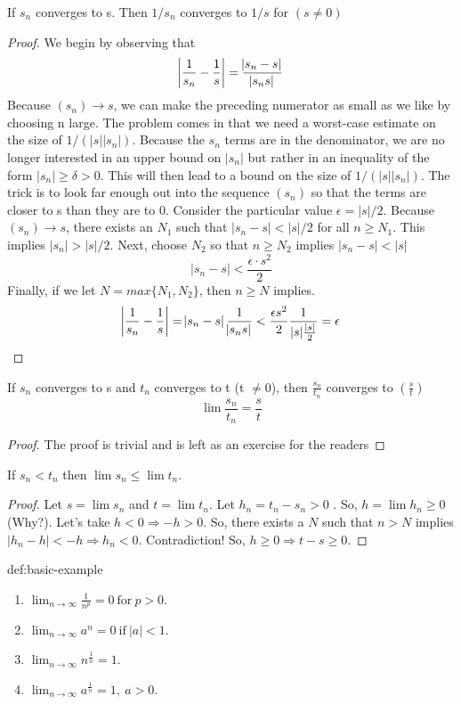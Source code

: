 \documentclass{notes}
\begin{document}
\begin{theorem}{}
	If $s_n$ converges to s. Then $1/s_n$ converges to $1/s$  for $(s \not = 0)$
\end{theorem}
\begin{proof}
	We begin by observing that
	$$  \abs{\frac{1}{s_n}- \frac{1}{s}} = \frac{\abs{s_n- s}}{\abs{ s_n s}}$$
	Because $(s_n) \rightarrow s$, we can make the preceding numerator as small as we like by
	choosing n large. The problem comes in that we need a worst-case estimate on
	the size of $1/(|s||s_n|)$. Because the $s_n$ terms are in the denominator, we are no
	longer interested in an upper bound on $|s_n|$ but rather in an inequality of the
	form $|s_n| \geq \delta > 0$. This will then lead to a bound on the size of $1/(|s||s_n|)$.
	The trick is to look far enough out into the sequence $(s_n)$ so that the terms
	are closer to s than they are to 0. Consider the particular value $\epsilon = |s|/2$.
	Because $(s_n) \rightarrow s$, there exists an $N_1$ such that $|s_n - s| < |s|/2$ for all $n \geq N_1$.
	This implies $|s_n| > |s|/2$.
	Next, choose $N_2$ so that $n \geq N_2$ implies
	$ |s_n- s| < |s| $
	$$ |s_n - s| < \frac{\epsilon \cdot s^2}{2}$$
	Finally, if we let $N = max\{N_1, N_2\}$, then $n \geq N$ implies.
	$$ \abs{\frac{1}{s_n}- \frac{1}{s}} = \abs{s_n - s}\frac{1}{\abs{s_n s}}< \frac{\epsilon s^2}{2} \frac{1}{|s|\frac{|s|}{2}} = \epsilon$$
\end{proof}

\begin{theorem}{}
	If $s_n$ converges to s and $t_n$ converges to t (t $\not = 0$), then $\frac{s_n}{t_n}$ converges to $(\frac{s}{t})$
	$$\lim \frac{s_n}{t_n} = \frac{s}{t}$$
\end{theorem}
\begin{proof}
	The proof is trivial and is left as an exercise for the readers
\end{proof}
\begin{theorem}{}
	If $s_n < t_n$ then $\lim s_n \leq \lim t_n$.
\end{theorem}
\begin{proof}
	Let $s = \lim s_n $ and $t = \lim t_n$. Let $h_n = t_n -s_n > 0 $ . So, $h = \lim h_n \geq 0$ (Why?). Let's  take $h < 0 \Rightarrow - h > 0$. So, there exists a $N$ such that $n >N$ implies $ |h_n -h | < -h \Rightarrow h_n < 0$. Contradiction! So, $h  \geq 0 \Rightarrow t - s \geq 0$. 
\end{proof}
\begin{theorem}{def:basic-example}
	
	\begin{enumerate}[\bf a.] %
		\item 
		$   \lim_{n \to \infty} \frac{1}{n^p} = 0\ \mathrm{for} \ p>0     $.
		\item
		$\lim_{n\to\infty} a^n = 0\ \mathrm{if}\ |a|<1$.
		\item 
		$\lim_{n\to\infty } n^{\frac{1}{n}} = 1$.
		\item
		$\lim_{n \to \infty} a^{\frac{1}{n}} = 1,\ a>0  $.
	\end{enumerate}
\end{theorem}
\end{document}
